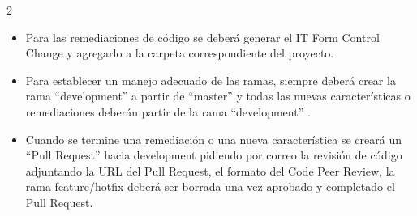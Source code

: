 \documentclass[a4paper, 10pt]{article}
\begin{document}
\begin{multicols}{2}
\begin{itemize}
\item Para las remediaciones de código se deberá generar el \sffamily IT Form Control Change \normalfont y agregarlo a la carpeta correspondiente del proyecto.

\item Para establecer un manejo adecuado de las ramas, siempre deberá crear la rama \sffamily“development” \normalfont a partir de \sffamily“master” \normalfont y todas las nuevas características o remediaciones deberán partir de la rama \sffamily“development” \normalfont.

\item Cuando se termine una remediación o una nueva característica se creará un \sffamily“Pull Request” \normalfont hacia development pidiendo por correo la revisión de código adjuntando la URL del Pull Request, el formato del \sffamily Code Peer Review, \normalfont la rama \sffamily feature/hotfix \normalfont deberá ser borrada una vez aprobado y completado el Pull Request.
\end{itemize}
\end{multicols}	
\end{document}
